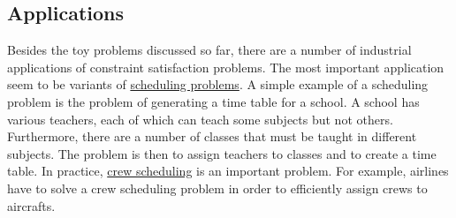 


\subsection{Applications}
Besides the toy problems discussed so far, there are a number of industrial applications of constraint
satisfaction problems.  The most important application seem to be variants of
\href{https://en.wikipedia.org/wiki/Scheduling_(production_processes)}{scheduling problems}. 
A simple example of a scheduling problem is the problem of generating a time table for a school.  A school has
various teachers, each of which can teach some subjects but not others.  Furthermore, there are a number of
classes that must be taught in different subjects.  The problem is then to assign teachers to classes and to
create a time table.  In practice, \href{https://en.wikipedia.org/wiki/Crew_scheduling}{crew scheduling} is an
important problem.  For example, airlines have to solve a crew scheduling problem in order to efficiently
assign crews to aircrafts.

